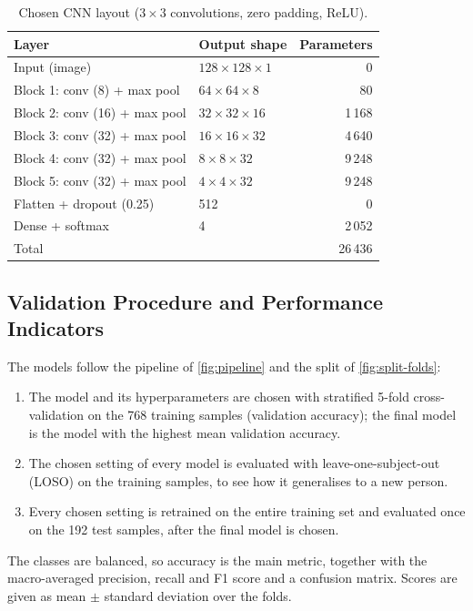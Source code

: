 \documentclass[10pt,a4paper,titlepage]{article}
\begin{document}
\begin{table}[!htbp]
  \centering
  \caption{Chosen CNN layout ($3 \times 3$ convolutions, zero padding, ReLU).}
  \label{tab:cnn-layout}
  \small
  \begin{tabular}{@{}llr@{}}
    \toprule
    Layer & Output shape & Parameters \\
    \midrule
    Input (image)                  & $128 \times 128 \times 1$ & 0 \\
    Block 1: conv (8) + max pool   & $64 \times 64 \times 8$   & 80 \\
    Block 2: conv (16) + max pool  & $32 \times 32 \times 16$  & 1\,168 \\
    Block 3: conv (32) + max pool  & $16 \times 16 \times 32$  & 4\,640 \\
    Block 4: conv (32) + max pool  & $8 \times 8 \times 32$    & 9\,248 \\
    Block 5: conv (32) + max pool  & $4 \times 4 \times 32$    & 9\,248 \\
    Flatten + dropout (0.25)       & 512                       & 0 \\
    Dense + softmax                & 4                         & 2\,052 \\
    \midrule
    Total                          &                           & 26\,436 \\
    \bottomrule
  \end{tabular}
\end{table}

\subsection{Validation Procedure and Performance Indicators}
\label{sec:validation}
The models follow the pipeline of \autoref{fig:pipeline} and the split of
\autoref{fig:split-folds}:
\begin{enumerate}
  \item The model and its hyperparameters are chosen with stratified 5-fold
        cross-validation on the 768 training samples (validation accuracy);
        the final model is the model with the highest mean validation accuracy.
  \item The chosen setting of every model is evaluated with leave-one-subject-out
        (LOSO) on the training samples, to see how it generalises to a new person.
  \item Every chosen setting is retrained on the entire training set and
        evaluated once on the 192 test samples, after the final model is chosen.
\end{enumerate}
The classes are balanced, so accuracy is the main metric, together with the
macro-averaged precision, recall and F1 score and a confusion matrix. Scores
are given as mean $\pm$ standard deviation over the folds.
\end{document}
